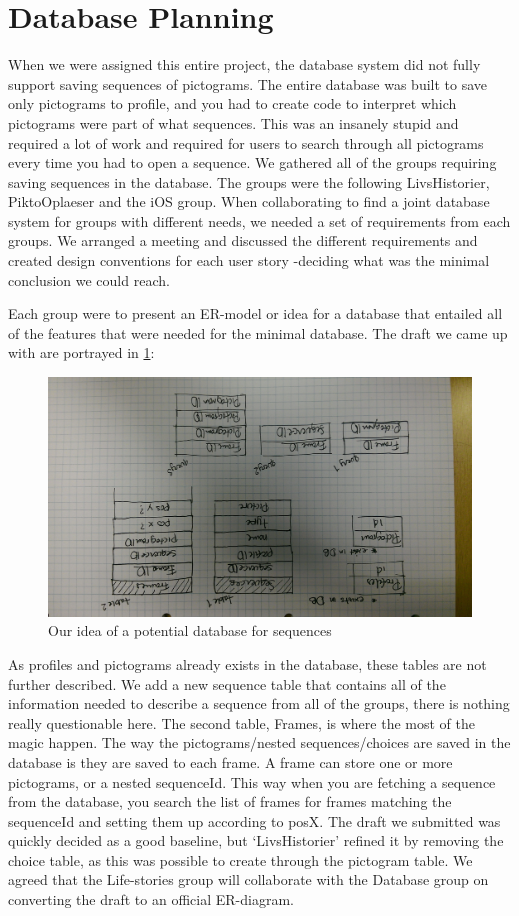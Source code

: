 \section{Database Planning}\label{sec:database_planning}

When we were assigned this entire project, the database system did not fully support saving sequences of pictograms. The entire database was built to save only pictograms to profile, and you had to create code to interpret which pictograms were part of what sequences. This was an insanely stupid and required a lot of work and required for users to search through all pictograms every time you had to open a sequence. We gathered all of the groups requiring saving sequences in the database. The groups were the following LivsHistorier, PiktoOplaeser and the iOS group.
When collaborating to find a joint database system for groups with different needs, we needed a set of requirements from each groups. We arranged a meeting and discussed the different requirements and created design conventions for each user story -deciding what was the minimal conclusion we could reach.

Each group were to present an ER-model or idea for a database that entailed all of the features that were needed for the minimal database. The draft we came up with are portrayed in \ref{fig:DBdescription}:
\begin{figure}
\centering
\includegraphics[width=0.7\linewidth]{Pics/ourDBdescription}
\caption{Our idea of a potential database for sequences}
\label{fig:DBdescription}
\end{figure}

As profiles and pictograms already exists in the database, these tables are not further described. We add a new sequence table that contains all of the information needed to describe a sequence from all of the groups, there is nothing really questionable here. The second table, Frames, is where the most of the magic happen. The way the pictograms/nested sequences/choices are saved in the database is they are saved to each frame. A frame can store one or more pictograms, or a nested sequenceId. This way when you are fetching a sequence from the database, you search the list of frames for frames matching the sequenceId and setting them up according to posX.\newline
\newline
The draft we submitted was quickly decided as a good baseline, but `LivsHistorier' refined it by removing the choice table, as this was possible to create through the pictogram table. We agreed that the Life-stories group will collaborate with the Database group on converting the draft to an official ER-diagram. 